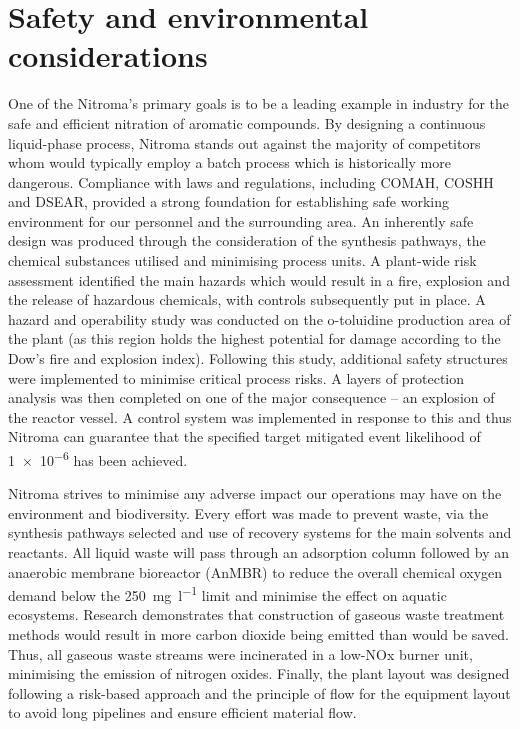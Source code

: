 \section*{Safety and environmental considerations}

 One of the Nitroma's primary goals is to be a leading example in industry for the safe and efficient nitration of aromatic compounds. By designing a continuous liquid-phase process, Nitroma stands out against the majority of competitors whom would typically employ a batch process which is historically more dangerous. Compliance with laws and regulations, including COMAH, COSHH and DSEAR, provided a strong foundation for establishing safe working environment for our personnel and the surrounding area. An inherently safe design was produced through the consideration of the synthesis pathways, the chemical substances utilised and minimising process units. A plant-wide risk assessment identified the main hazards which would result in a fire, explosion and the release of hazardous chemicals, with controls subsequently put in place. A hazard and operability study was conducted on the o-toluidine production area of the plant (as this region holds the highest potential for damage according to the Dow's fire and explosion index). Following this study, additional safety structures were implemented to minimise critical process risks. A layers of protection analysis was then completed on one of the major consequence – an explosion of the reactor vessel. A control system was implemented in response to this and thus Nitroma can guarantee that the specified target mitigated event likelihood of \num{1e-6} has been achieved.

Nitroma strives to minimise any adverse impact our operations may have on the environment and biodiversity. Every effort was made to prevent waste, via the synthesis pathways selected and use of recovery systems for the main solvents and reactants. All liquid waste will pass through an adsorption column followed by an anaerobic membrane bioreactor (AnMBR) to reduce the overall chemical oxygen demand below the \SI{250}{\mg\per\litre} limit and minimise the effect on aquatic ecosystems. Research demonstrates that construction of gaseous waste treatment methods would result in more carbon dioxide being emitted than would be saved. Thus, all gaseous waste streams were incinerated in a low-NOx burner unit, minimising the emission of nitrogen oxides. Finally, the plant layout was designed following a risk-based approach and the principle of flow for the equipment layout to avoid long pipelines and ensure efficient material flow. 

